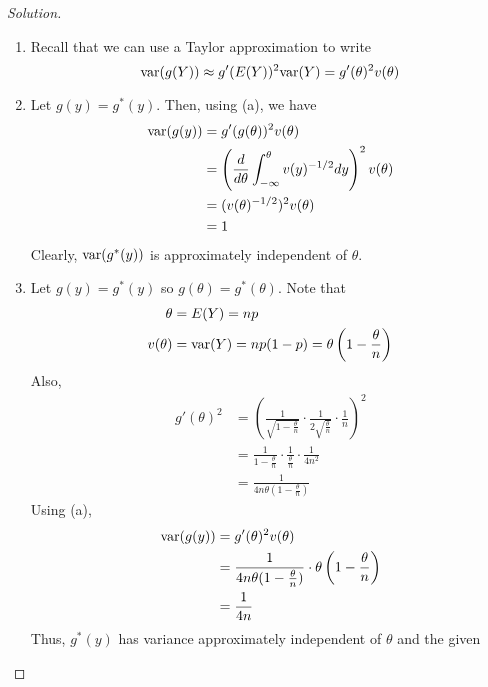 \documentclass[letterpaper, 12pt]{article}
\newcommand{\vari}{\textnormal{var}}
\begin{document}
\begin{proof}[Solution]
    \begin{enumerate}
        \item Recall that we can use a Taylor approximation to write 
            $$\vari (g(Y)) \approx g'(E(Y))^2 \vari(Y) = g'(\theta)^2 v(\theta)$$ 
        \item Let $g(y) = g^*(y)$. Then, using (a), we have 
            \begin{align*}
                \vari(g(y)) &= g'(g(\theta))^2 v(\theta) \\ 
                              &= \left(\frac{d}{d\theta}\int_{-\infty}^\theta v(y)^{-1/2}
                              dy\right)^2 v(\theta) \\ 
                              &= (v(\theta)^{-1/2})^2v(\theta) \\ 
                              &= 1
            \end{align*}
            Clearly, $\vari(g^*(y))$ is approximately independent of $\theta$. 
        \item Let $g(y) = g^*(y)$ so $g(\theta) = g^*(\theta)$. 
            Note that 
            \begin{align*}
                \theta &= E(Y) = np \\ 
                v(\theta) &= \vari(Y) = np(1 - p) = \theta\left(1 - \frac{\theta}{n}\right)
            \end{align*} 
            Also, 
            \begin{align*}
                g'(\theta)^2 &= \left(\frac{1}{\sqrt{1 - \frac{\theta}{n}}}\cdot
                    \frac{1}{2\sqrt{\frac{\theta}{n}}}\cdot\frac{1}{n}\right)^2 \\ 
                      &= \frac{1}{1 -
                          \frac{\theta}{n}}\cdot\frac{1}{\frac{\theta}{n}}\cdot\frac{1}{4n^2} \\ 
                      &= \frac{1}{4n\theta(1 - \frac{\theta}{n})}
            \end{align*}
            Using (a), 
            \begin{align*}
                \vari(g(y)) &= g'(\theta)^2 v(\theta) \\ 
                              &= \frac{1}{4n\theta(1 - \frac{\theta}{n})} \cdot \theta\left(1 -
                                  \frac{\theta}{n}\right) \\ 
                              &= \frac{1}{4n}
            \end{align*}
            Thus, $g^*(y)$ has variance approximately independent of $\theta$ and the given

\end{enumerate}
\end{proof}
\end{document}
